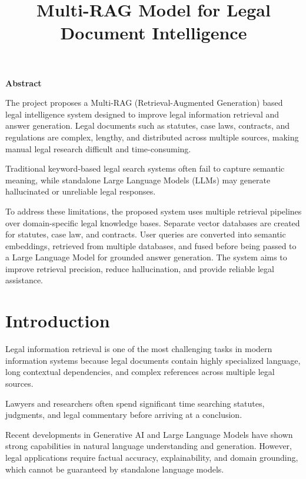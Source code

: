 \documentclass[12pt,a4paper]{article}
\title{\textbf{Multi-RAG Model for Legal Document Intelligence}}
\author{}
\date{}
\begin{document}
\maketitle

\begin{center}
\textbf{Abstract}
\end{center}

The project proposes a Multi-RAG (Retrieval-Augmented Generation) based legal intelligence system designed to improve legal information retrieval and answer generation. Legal documents such as statutes, case laws, contracts, and regulations are complex, lengthy, and distributed across multiple sources, making manual legal research difficult and time-consuming.

Traditional keyword-based legal search systems often fail to capture semantic meaning, while standalone Large Language Models (LLMs) may generate hallucinated or unreliable legal responses.

To address these limitations, the proposed system uses multiple retrieval pipelines over domain-specific legal knowledge bases. Separate vector databases are created for statutes, case law, and contracts. User queries are converted into semantic embeddings, retrieved from multiple databases, and fused before being passed to a Large Language Model for grounded answer generation. The system aims to improve retrieval precision, reduce hallucination, and provide reliable legal assistance.

\newpage

\tableofcontents

\newpage

\section{Introduction}

Legal information retrieval is one of the most challenging tasks in modern information systems because legal documents contain highly specialized language, long contextual dependencies, and complex references across multiple legal sources.

Lawyers and researchers often spend significant time searching statutes, judgments, and legal commentary before arriving at a conclusion.

Recent developments in Generative AI and Large Language Models have shown strong capabilities in natural language understanding and generation. However, legal applications require factual accuracy, explainability, and domain grounding, which cannot be guaranteed by standalone language models.
\end{document}
